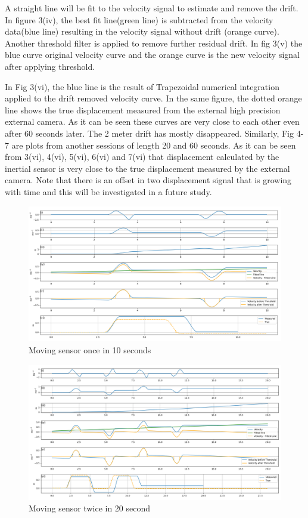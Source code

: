 \documentclass{article}
\begin{document}
A straight line will be fit to the velocity signal to estimate and remove the drift. In figure 3(iv), the best fit line(green line) is subtracted from the velocity data(blue line) resulting in the velocity signal without drift (orange curve). Another threshold filter is applied to remove further residual drift. In fig 3(v)  the blue curve original velocity curve and the orange curve is the new velocity signal after applying threshold.

In Fig 3(vi), the blue line is the result of Trapezoidal numerical integration applied to the drift removed velocity curve. In the same figure, the dotted orange line shows the true displacement measured from the external high precision external camera. As it can be seen these curves are very close to each other even after 60 seconds later. The 2 meter drift has mostly disappeared. Similarly, Fig 4-7 are plots from another sessions of length 20 and 60 seconds. As it can be seen from 3(vi), 4(vi), 5(vi), 6(vi) and 7(vi) that displacement calculated by the inertial sensor is very close to the true displacement measured by the external camera. Note that there is an offset in two displacement signal that is growing with time and this will be investigated in a future study.

\begin{figure}[hbt!]
  \includegraphics[width=\textwidth]{10.png}
  \caption{Moving sensor once in 10 seconds}
\end{figure}

\begin{figure}[hbt!]
  \includegraphics[width=\textwidth]{11.png}
  \caption{Moving sensor twice in 20 second}
\end{figure}
\end{document}
